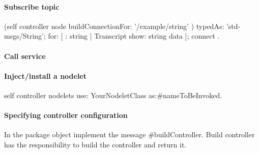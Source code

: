 \documentclass[a4paper,10pt,twoside]{book}
\begin{document}
	\paragraph{Subscribe topic \newline}

	
	
	\begin{code}
	(self controller node buildConnectionFor: '/example/string' ) 
			typedAs: 'std-msgs/String'; 
			for: [ : string |  Transcript show: string data ];
			connect .
	\end{code}
	
	\paragraph{Call service \newline}

	
	
	\paragraph {Inject/install a nodelet \newline}
	
	\begin{code}
	self controller nodelets use: YourNodeletClass as:\#nameToBeInvoked.
	\end{code}
	
	
	\paragraph{Specifying controller configuration \newline}
	
	In the package object implement the message \#buildController. Build controller has the responsibility to build the controller and return it. 
	
\end{document}

